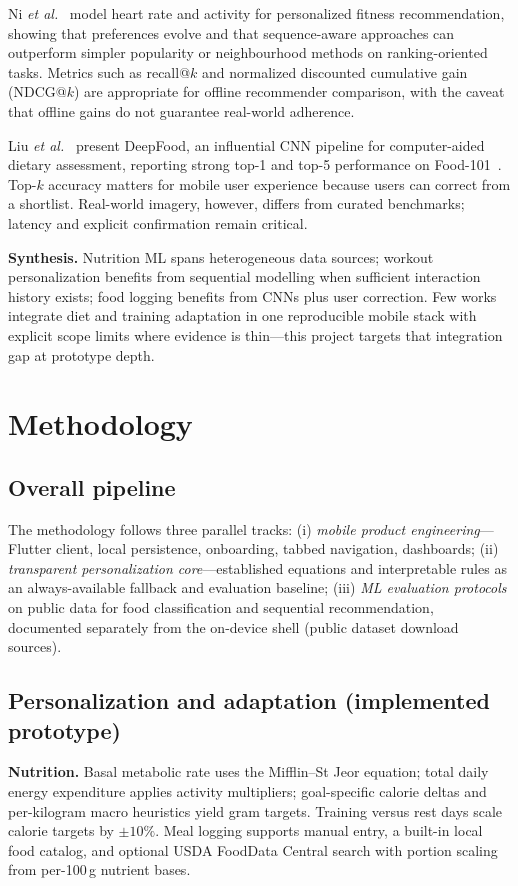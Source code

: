 \documentclass[conference]{IEEEtran}
\begin{document}
Ni \emph{et al.}~\cite{ni2019modeling} model heart rate and activity for personalized fitness recommendation, showing that preferences evolve and that sequence-aware approaches can outperform simpler popularity or neighbourhood methods on ranking-oriented tasks. Metrics such as recall@$k$ and normalized discounted cumulative gain (NDCG@$k$) are appropriate for offline recommender comparison, with the caveat that offline gains do not guarantee real-world adherence.

Liu \emph{et al.}~\cite{liu2016deepfood} present DeepFood, an influential CNN pipeline for computer-aided dietary assessment, reporting strong top-1 and top-5 performance on Food-101~\cite{bossard2014food}. Top-$k$ accuracy matters for mobile user experience because users can correct from a shortlist. Real-world imagery, however, differs from curated benchmarks; latency and explicit confirmation remain critical.

\textbf{Synthesis.} Nutrition ML spans heterogeneous data sources; workout personalization benefits from sequential modelling when sufficient interaction history exists; food logging benefits from CNNs plus user correction. Few works integrate diet and training adaptation in one reproducible mobile stack with explicit scope limits where evidence is thin---this project targets that integration gap at prototype depth.

\section{Methodology}
\subsection{Overall pipeline}
The methodology follows three parallel tracks: (i) \emph{mobile product engineering}---Flutter client, local persistence, onboarding, tabbed navigation, dashboards; (ii) \emph{transparent personalization core}---established equations and interpretable rules as an always-available fallback and evaluation baseline; (iii) \emph{ML evaluation protocols} on public data for food classification and sequential recommendation, documented separately from the on-device shell (public dataset download sources).

\subsection{Personalization and adaptation (implemented prototype)}
\textbf{Nutrition.} Basal metabolic rate uses the Mifflin--St Jeor equation; total daily energy expenditure applies activity multipliers; goal-specific calorie deltas and per-kilogram macro heuristics yield gram targets. Training versus rest days scale calorie targets by $\pm 10\%$. Meal logging supports manual entry, a built-in local food catalog, and optional USDA FoodData Central search with portion scaling from per-100\,g nutrient bases.
\end{document}
